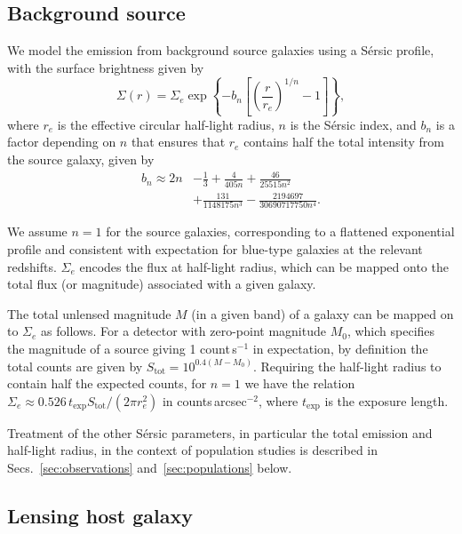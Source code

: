 \documentclass[twocolumn]{aastex62}
\begin{document}
\subsection{Background source}

We model the emission from background source galaxies using a S\'{e}rsic profile, with the surface brightness given by
\begin{equation}
\Sigma(r)=\Sigma_{e} \exp \left\{-b_{n}\left[\left(\frac{r}{r_{e}}\right)^{1 / n}-1\right]\right\},
\end{equation}
where $r_e$ is the effective circular half-light radius, $n$ is the S\'{e}rsic index, and $b_n$ is a factor depending on $n$ that ensures that $r_e$ contains half the total intensity from the source galaxy, given by~\citep{1999A&A...352..447C}
\begin{align}
b_n \approx 2 n &- \frac{1}{3} + \frac{4}{405 n} + \frac{46}{25515 n^2} \nonumber \\ &+ \frac{131}{1148175 n^3} - \frac{2194697}{30690717750 n^4}. \nonumber
\end{align}

We assume $n=1$ for the source galaxies, corresponding to a flattened exponential profile and consistent with expectation for blue-type galaxies at the relevant redshifts. $\Sigma_{e}$ encodes the flux at half-light radius, which can be mapped onto the total flux (or magnitude) associated with a given galaxy. 

The total unlensed magnitude $M$ (in a given band) of a galaxy can be mapped on to $\Sigma_{e}$ as follows. For a detector with zero-point magnitude $M_0$, which specifies the magnitude of a source giving 1 count\,s$^{-1}$ in expectation, by definition the total counts are given by $S_\mathrm{tot}=10^{0.4(M-M_0)}$. Requiring the half-light radius to contain half the expected counts, for $n=1$ we have the relation $\Sigma_{e} \approx 0.526\,t_\mathrm{exp}S_\mathrm{tot} /(2\pi r_e^2)$ in counts\,arcsec$^{-2}$, where $t_\mathrm{exp}$ is the exposure length.

Treatment of the other S\'{e}rsic parameters, in particular the total emission and half-light radius, in the context of population studies is described in Secs.~\ref{sec:observations} and~\ref{sec:populations} below.

\subsection{Lensing host galaxy}
\end{document}
